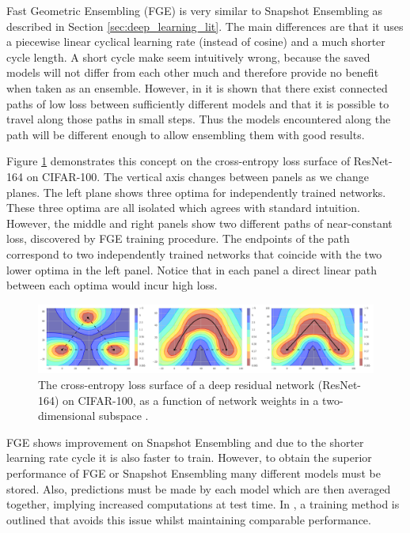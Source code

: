 Fast Geometric Ensembling (FGE) is very similar to Snapshot Ensembling as described in Section \ref{sec:deep_learning_lit}.
The main differences are that it uses a piecewise linear cyclical learning rate (instead of cosine) and a much shorter cycle length.
A short cycle make seem intuitively wrong, because the saved models will not differ from each other much and therefore provide no benefit when taken as an ensemble.
However, in \cite{Garipov_Izmailov_Podoprikhin_Vetrov_Wilson_2018} it is shown that there exist connected paths of low loss between sufficiently different models and that it is possible to travel along those paths in small steps.
Thus the models encountered along the path will be different enough to allow ensembling them with good results.

Figure \ref{fig:FGE_shortest_path} demonstrates this concept on the cross-entropy loss surface of ResNet-164 on CIFAR-100.
The vertical axis changes between panels as we change planes.
The left plane shows three optima for independently trained networks.
These three optima are all isolated which agrees with standard intuition.
However, the middle and right panels show two different paths of near-constant loss, discovered by FGE training procedure.
The endpoints of the path correspond to two independently trained networks that coincide with the two lower optima in the left panel.
Notice that in each panel a direct linear path between each optima would incur high loss.

\begin{figure}[hbtp!]
    \centering
    \includegraphics[width=\textwidth]{./img/FGE.png}
    \caption{The cross-entropy loss surface of a deep residual network (ResNet-164) on CIFAR-100, as a function of network weights in a two-dimensional subspace \cite{Garipov_Izmailov_Podoprikhin_Vetrov_Wilson_2018}.}
    \label{fig:FGE_shortest_path}
\end{figure}

FGE shows improvement on Snapshot Ensembling and due to the shorter learning rate cycle it is also faster to train.
However, to obtain the superior performance of FGE or Snapshot Ensembling many different models must be stored.
Also, predictions must be made by each model which are then averaged together, implying increased computations at test time.
In \cite{Izmailov_Podoprikhin_Garipov_Vetrov_Wilson_2018}, a training method is outlined that avoids this issue whilst maintaining comparable performance.

